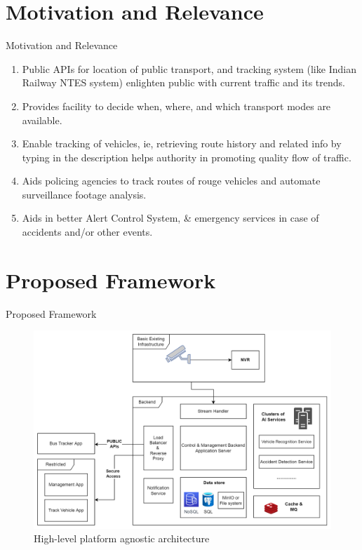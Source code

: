 \documentclass{beamer}
\begin{document}
\section{Motivation and Relevance}
\begin{frame}{Motivation and Relevance}
	\begin{enumerate}
	    \item Public APIs for location of public transport, and tracking system (like Indian Railway NTES system) enlighten public with current traffic and its trends.
	    \item Provides facility to decide when, where, and which transport modes are available.
		\item Enable tracking of vehicles, ie, retrieving route history and related info by typing in the description helps authority in promoting quality flow of traffic.
		\item Aids policing agencies to track routes of rouge vehicles and automate surveillance footage analysis.
		\item Aids in better Alert Control System, \& emergency services in case of accidents and/or other events.
		
	\end{enumerate}
\end{frame}


\section{Proposed Framework}
\begin{frame}{Proposed Framework}
	\begin{figure}
        \includegraphics[width=0.8\linewidth]{res/architecture.png}
        \caption{High-level platform agnostic architecture}
    \end{figure}
\end{frame}
\end{document}
